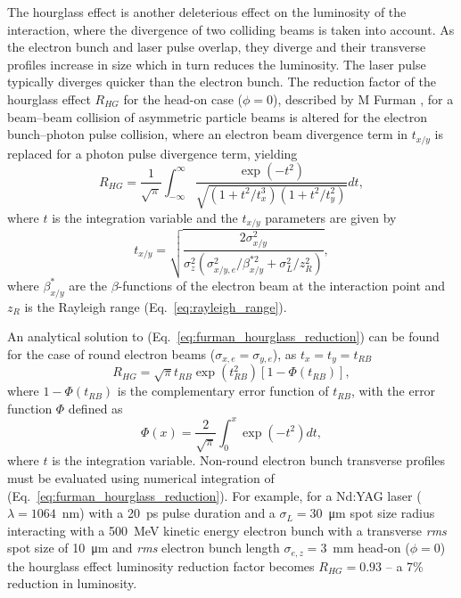 \documentclass[../main.tex]{subfiles}
\begin{document}
The hourglass effect is another deleterious effect on the luminosity of the interaction, where the divergence of two colliding beams is taken into account. As the electron bunch and laser pulse overlap, they diverge and their transverse profiles increase in size which in turn reduces the luminosity. The laser pulse typically diverges quicker than the electron bunch. The reduction factor of the hourglass effect $R_{HG}$ for the head-on case ($\phi = 0$), described by M Furman \cite{furman1991hourglass}, for a beam--beam collision of asymmetric particle beams is altered for the electron bunch--photon pulse collision, where an electron beam divergence term in $t_{x/y}$ is replaced for a photon pulse divergence term, yielding
\begin{equation}
R_{HG} = \frac{1}{\sqrt{\pi}}\int_{-\infty}^{\infty}\frac{\exp\left(-t^{2}\right)}{\sqrt{\left(1+t^{2}/t_{x}^{3}\right)\left(1+t^{2}/t_{y}^{2}\right)}}dt,
\label{eq:furman_hourglass_reduction}    
\end{equation}
where $t$ is the integration variable and the $t_{x/y}$ parameters are given by
\begin{equation}
t_{x/y} = \sqrt{\frac{2\sigma_{x/y}^{2}}{\sigma_{z}^{2}\left(\sigma_{x/y,e}^{2}/\beta_{x/y}^{*2}+\sigma_{L}^{2}/z_{R}^{2}\right)}},
\label{eq:furman_txy_parameters}    
\end{equation}
where $\beta_{x/y}^{*}$ are the $\beta$-functions of the electron beam at the interaction point and $z_{R}$ is the Rayleigh range (Eq.~\ref{eq:rayleigh_range}).

An analytical solution to (Eq.~\ref{eq:furman_hourglass_reduction}) can be found for the case of round electron beams ($\sigma_{x,e}=\sigma_{y,e}$), as $t_{x}=t_{y}=t_{RB}$
\begin{equation}
R_{HG} = \sqrt{\pi}t_{RB}\exp\left(t_{RB}^{2}\right)\left[1-\Phi\left(t_{RB}\right)\right],
\label{eq:furman_hourglass_reduction_analytical}    
\end{equation}
where $1-\Phi\left(t_{RB}\right)$ is the complementary error function of $t_{RB}$, with the error function $\Phi$ defined as
\begin{equation}
\Phi\left(x\right) = \frac{2}{\sqrt{\pi}}\int_{0}^{x}\exp\left(-t^{2}\right)dt,
\label{eq:error_function}    
\end{equation}
where $t$ is the integration variable. Non-round electron bunch transverse profiles must be evaluated using numerical integration of (Eq.~\ref{eq:furman_hourglass_reduction}). For example, for a Nd:YAG laser ($\lambda = 1064$~\si{\nano\meter}) with a 20~\si{\pico\second} pulse duration and a $\sigma_{L} = 30$~\si{\micro\meter} spot size radius interacting with a 500~\si{\mega\electronvolt} kinetic energy electron bunch with a transverse \textit{rms} spot size of 10~\si{\micro\meter} and \textit{rms} electron bunch length $\sigma_{e,z} = 3$~\si{\milli\meter} head-on ($\phi=0$) the hourglass effect luminosity reduction factor becomes $R_{HG} = 0.93$ -- a 7\% reduction in luminosity.
\end{document}
